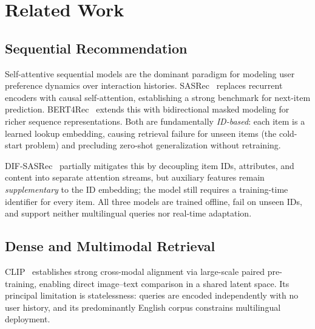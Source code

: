 \section{Related Work}
\label{sec:related}


\subsection{Sequential Recommendation}
Self-attentive sequential models are the dominant paradigm for modeling
user preference dynamics over interaction histories.
SASRec~\cite{kang2018self} replaces recurrent encoders with causal
self-attention, establishing a strong benchmark for next-item prediction.
BERT4Rec~\cite{sun2019bert4rec} extends this with bidirectional masked
modeling for richer sequence representations.
Both are fundamentally \emph{ID-based}: each item is a learned lookup
embedding, causing retrieval failure for unseen items (the cold-start problem)
and precluding zero-shot generalization without retraining.

DIF-SASRec~\cite{xie2022difsr} partially mitigates this by decoupling item
IDs, attributes, and content into separate attention streams, but auxiliary
features remain \emph{supplementary} to the ID embedding; the model still
requires a training-time identifier for every item.
All three models are trained offline, fail on unseen IDs, and support neither
multilingual queries nor real-time adaptation.

\subsection{Dense and Multimodal Retrieval}
CLIP~\cite{radford2021clip} establishes strong cross-modal alignment via
large-scale paired pre-training, enabling direct image--text comparison in a
shared latent space. Its principal limitation is statelessness: queries are
encoded independently with no user history, and its predominantly English
corpus constrains multilingual deployment.

